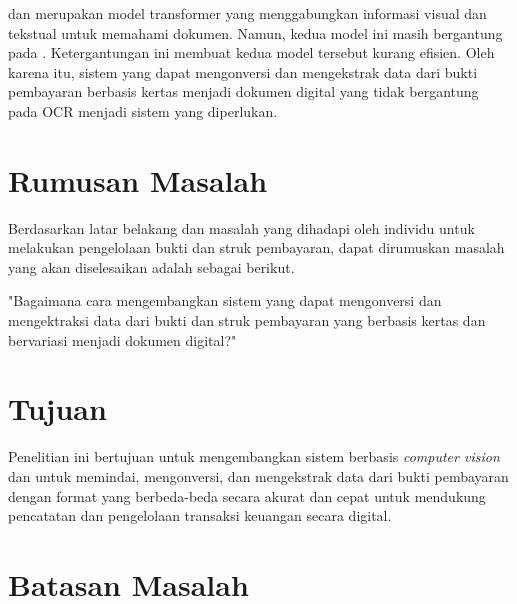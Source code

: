 \layoutlm{} dan \bert{} merupakan model transformer yang menggabungkan informasi visual dan tekstual untuk memahami dokumen. Namun, kedua model ini masih bergantung pada \ocr. Ketergantungan ini membuat kedua model tersebut kurang efisien. Oleh karena itu, sistem yang dapat mengonversi dan mengekstrak data dari bukti pembayaran berbasis kertas menjadi dokumen digital yang tidak bergantung pada OCR menjadi sistem yang diperlukan.

\section{Rumusan Masalah}
\label{sec:rumusanmasalah}

Berdasarkan latar belakang dan masalah yang dihadapi oleh individu untuk melakukan pengelolaan bukti dan struk pembayaran, dapat dirumuskan masalah yang akan diselesaikan adalah sebagai berikut.

\begin{center}
	"Bagaimana cara mengembangkan sistem yang dapat mengonversi dan mengektraksi data dari bukti dan struk pembayaran yang berbasis kertas dan bervariasi menjadi dokumen digital?"
\end{center}

\section{Tujuan}
\label{sec:tujuan}

Penelitian ini bertujuan untuk mengembangkan sistem berbasis \emph{computer vision} dan \dl{} untuk memindai, mengonversi, dan mengekstrak data dari bukti pembayaran dengan format yang berbeda-beda secara akurat dan cepat untuk mendukung pencatatan dan pengelolaan transaksi keuangan secara digital.

\section{Batasan Masalah}
\label{sec:batasanmasalah}

